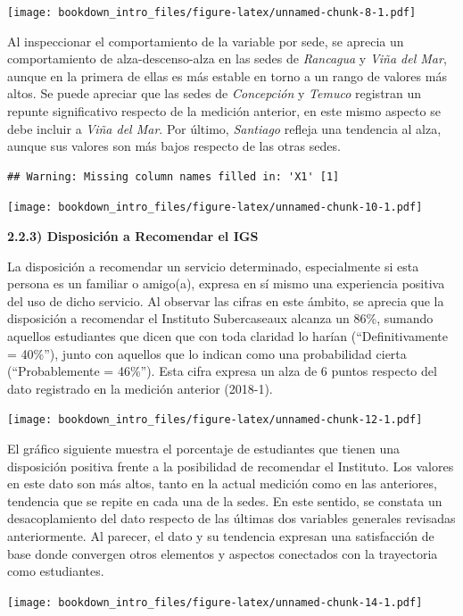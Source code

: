 \documentclass[]{book}
\begin{document}
\texttt{[image: bookdown\_intro\_files/figure-latex/unnamed-chunk-8-1.pdf]}

Al inspeccionar el comportamiento de la variable por sede, se aprecia un
comportamiento de alza-descenso-alza en las sedes de \emph{Rancagua} y
\emph{Viña del Mar}, aunque en la primera de ellas es más estable en
torno a un rango de valores más altos. Se puede apreciar que las sedes
de \emph{Concepción} y \emph{Temuco} registran un repunte significativo
respecto de la medición anterior, en este mismo aspecto se debe incluir
a \emph{Viña del Mar}. Por último, \emph{Santiago} refleja una tendencia
al alza, aunque sus valores son más bajos respecto de las otras sedes.

\begin{verbatim}
## Warning: Missing column names filled in: 'X1' [1]
\end{verbatim}

\texttt{[image: bookdown\_intro\_files/figure-latex/unnamed-chunk-10-1.pdf]}

\textbf{2.2.3) Disposición a Recomendar el IGS}

La disposición a recomendar un servicio determinado, especialmente si
esta persona es un familiar o amigo(a), expresa en sí mismo una
experiencia positiva del uso de dicho servicio. Al observar las cifras
en este ámbito, se aprecia que la disposición a recomendar el Instituto
Subercaseaux alcanza un 86\%, sumando aquellos estudiantes que dicen que
con toda claridad lo harían (``Definitivamente = 40\%''), junto con
aquellos que lo indican como una probabilidad cierta (``Probablemente =
46\%''). Esta cifra expresa un alza de 6 puntos respecto del dato
registrado en la medición anterior (2018-1).

\texttt{[image: bookdown\_intro\_files/figure-latex/unnamed-chunk-12-1.pdf]}

El gráfico siguiente muestra el porcentaje de estudiantes que tienen una
disposición positiva frente a la posibilidad de recomendar el Instituto.
Los valores en este dato son más altos, tanto en la actual medición como
en las anteriores, tendencia que se repite en cada una de la sedes. En
este sentido, se constata un desacoplamiento del dato respecto de las
últimas dos variables generales revisadas anteriormente. Al parecer, el
dato y su tendencia expresan una satisfacción de base donde convergen
otros elementos y aspectos conectados con la trayectoria como
estudiantes.

\texttt{[image: bookdown\_intro\_files/figure-latex/unnamed-chunk-14-1.pdf]}
\end{document}
